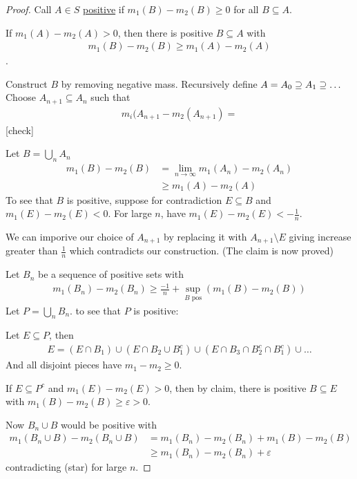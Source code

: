 \begin{proof}
	Call $A \in S$ \underline{positive} if $m_1 (B) - m_2 (B) \geq 0$ for all $B \subseteq A$.

	 \begin{claim}
		 If $m_1 (A) - m_{2} (A) > 0$, then there is positive $B \subseteq A$ with
		 \begin{align*}
			 m_{1} (B) - m_{2} (B) \geq m_1 (A) - m_2 (A)
		 \end{align*}.
	\end{claim}
	Construct $B$ by removing negative mass. Recursively define $A = A_{0} \supseteq A_1 \supseteq \ldots$
	Choose $A_{n+1 } \subseteq A_{n}$ such that
	\begin{align*}
		m_{i} (A_{n +1} - m_{2} (A_{n+1}) = 
	\end{align*} [check]
	
	Let $B = \bigcup_{n} A_{n}$
	\begin{align*}
		m_{1} (B) - m_{2} (B) &= \lim_{n \to \infty} m_{1} (A_{n}) - m_{2} (A_{n}) \\
							  &\geq m_{1} (A) - m_{2} (A)
	\end{align*} 
	To see that $B$ is positive, suppose for contradiction $E \subseteq B$ and $m_{1} (E) - m_{2} (E) < 0$. 
	For large $n$, have $m_1 (E) - m_{2} (E) < -\frac{1}{n}$.

	We can imporive our choice of $A_{n +1}$ by replacing it with $A_{n +1 } \setminus E$ giving increase greater than $\frac{1}{n}$ which contradicts our construction. 
	(The claim is now proved)

	Let $B_{n}$ be a sequence of positive sets with 
	\begin{align*}
		m_{1} (B_{n}) - m_{2} (B_{n}) \geq \frac{-1}{n} + \sup_{B \text{ pos}} (m_{1} (B) - m_{2} (B))
	\end{align*} 
	Let $P = \bigcup_{n} B_{n}$. to see that $P$ is positive:
	
	Let $E \subseteq  P$, then
	\begin{align*}
		E = ( E \cap B_{1} ) \cup ( E \cap B_{2} \cup B_{1}^c) \cup ( E \cap B_{3} \cap B_{2}^{c} \cap B_{1}^c ) \cup \ldots
	\end{align*} 
	And all disjoint pieces have $m_{1} - m_{2} \geq 0$.

	If $E \subseteq P^c$ and $m_{1} (E) - m_{2} (E) > 0$, then by claim, there is positive $B \subseteq E$
	with $m_{1} (B) - m_{2} (B) \geq \varepsilon > 0$.

	Now $B_{n} \cup B$ would be positive with
	\begin{align*}
		m_{1} (B_{n} \cup B) - m_{2} (B_{n} \cup B) &= m_{1} (B_{n}) - m_{2} (B_{n} ) + m_{1} (B) - m_{2} (B) \\
													&\geq m_{1} (B_{n}) - m_{2} (B_{n} ) + \varepsilon
	\end{align*}
	contradicting (star) for large $n$.
\end{proof}

